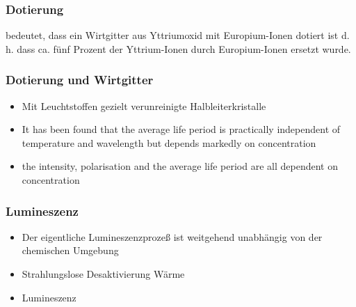 \documentclass{beamer}
\begin{document}
    \begin{table}
      \centering
{}
\end{table}

\begin{frame}[t]\frametitle{Dotierung}
 bedeutet, dass ein Wirtgitter aus Yttriumoxid mit Europium-Ionen dotiert ist
 d. h. dass ca. fünf Prozent der Yttrium-Ionen durch Europium-Ionen ersetzt wurde.


\end{frame}


\begin{frame}[t]\frametitle{Dotierung und Wirtgitter}
\begin{itemize}
  \item Mit Leuchtstoffen gezielt verunreinigte Halbleiterkristalle
  \item It has been found that the average life period is practically independent of temperature and wavelength but depends markedly on concentration 
  \item the intensity, polarisation and the average life period are all dependent on concentration
\end{itemize}


\end{frame}

  \begin{frame}
  \frametitle{Lumineszenz}
    \begin{itemize}
    \item Der eigentliche Lumineszenzprozeß ist weitgehend unabhängig von der chemischen Umgebung
    \item Strahlungslose Desaktivierung  Wärme
    \item Lumineszenz 
    \end{itemize}
  \end{frame}
  
\end{document}
